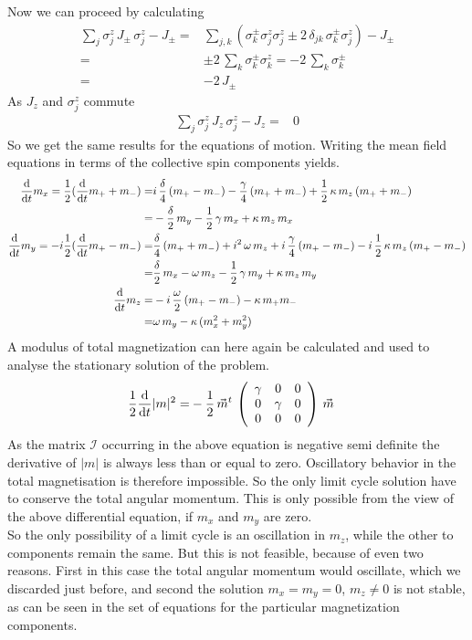 \documentclass{article}
\begin{document}
Now we can proceed by calculating 
\begin{align*}
    \sum_j\sigma_j^z\,J_\pm\,\sigma_j^z-J_\pm=&\sum_{j,k}(\sigma_k^\pm\sigma_j^z\sigma_j^z\pm2\,\delta_{jk}\,\sigma_k^\pm\sigma_j^z)-J_\pm\\
    =&\pm2\,\sum_k\sigma_k^\pm\sigma_k^z=-2\,\sum_k\sigma_k^\pm\\
    =&-2\,J_\pm
\end{align*}
As $J_z$ and $\sigma_j^z$ commute 
\begin{align*}
    \sum_j\sigma_j^z\,J_z\,\sigma_j^z-J_z=&0
\end{align*}
So we get the same results for the equations of motion. Writing the mean field equations in terms of the collective spin components yields.
\begin{align*}
    \frac{\text{d}}{\text{d}t} m_x = \frac{1}{2} (\frac{\text{d}}{\text{d}t} m_+ + m_-)=& i\,\frac{\delta}{4}\,(m_+-m_-)-\frac{\gamma}{4}\,(m_+ + m_-)+\frac{1}{2}\,\kappa\,m_z\,(m_+ + m_-)\\
    =&-\frac{\delta}{2}\,m_y-\frac{1}{2}\,\gamma\,m_x+\kappa\,m_z\,m_x\\
    \frac{\text{d}}{\text{d}t} m_y = -i\frac{1}{2} (\frac{\text{d}}{\text{d}t} m_+ - m_-)=& \frac{\delta}{4}\,(m_++m_-)+i^2\,\omega\,m_z+i\,\frac{\gamma}{4}\,(m_+ - m_-)-i\,\frac{1}{2}\,\kappa\,m_z\,(m_+ - m_-)\\
    =&\frac{\delta}{2}\,m_x-\omega\,m_z-\frac{1}{2}\,\gamma\,m_y+\kappa\,m_z\,m_y\\
    \frac{\text{d}}{\text{d}t} m_z=&-i\,\frac{\omega}{2}\,(m_+ - m_-) - \kappa\,m_+ m_-\\
    =&\omega\,m_y  - \kappa\,(m_x^2+ m_y^2)
\end{align*}
A modulus of total magnetization can here again be calculated and used to analyse the stationary solution of the problem.
\begin{align*}
    \frac{1}{2}\frac{\text{d}}{\text{d}t} |m|^2=&-\frac{1}{2}\,\vec{m}^t\,\left( \begin{array}{ccc}
         \gamma & 0&0  \\
         0& \gamma & 0\\
         0&0&0
    \end{array}\right)\,\vec{m}
\end{align*}
As the matrix $\mathcal{I}$ occurring in the above equation is negative semi definite the derivative of $|m|$ is always less than or equal to zero. Oscillatory behavior in the total magnetisation is therefore impossible. So the only limit cycle solution have to conserve the total angular momentum. This is only possible from the view of the above differential equation, if $m_x$ and $m_y$ are zero.\\
So the only possibility of a limit cycle is an oscillation in $m_z$, while the other to components remain the same. But this is not feasible, because of even two reasons. First in this case the total angular momentum would oscillate, which we discarded just before, and second the solution $m_x=m_y=0$, $m_z\neq0$ is not stable, as can be seen in the set of equations for the particular magnetization components.\\\\
\end{document}
